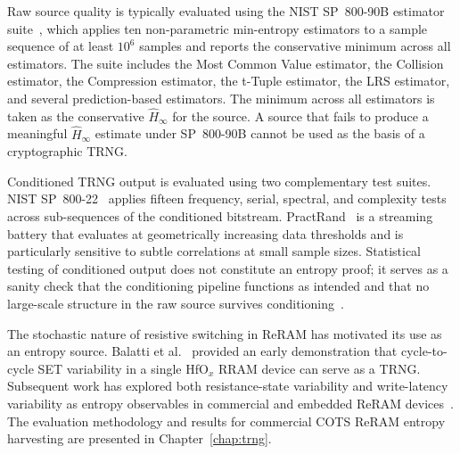 Raw source quality is typically evaluated using the NIST SP~800-90B
estimator suite~\cite{sonmez2016recommendation}, which applies ten
non-parametric min-entropy estimators to a sample sequence of at least
$10^6$ samples and reports the conservative minimum across all
estimators. The suite includes the Most Common Value estimator, the
Collision estimator, the Compression estimator, the t-Tuple estimator,
the LRS estimator, and several prediction-based estimators. The minimum
across all estimators is taken as the conservative $\hat{H}_\infty$ for
the source. A source that fails to produce a meaningful $\hat{H}_\infty$
estimate under SP~800-90B cannot be used as the basis of a cryptographic
TRNG.

Conditioned TRNG output is evaluated using two complementary test
suites. NIST SP~800-22~\cite{rukhin2001statistical} applies fifteen
frequency, serial, spectral, and complexity tests across sub-sequences
of the conditioned bitstream. PractRand~\cite{practrand} is a streaming
battery that evaluates at geometrically increasing data thresholds and
is particularly sensitive to subtle correlations at small sample sizes.
Statistical testing of conditioned output does not constitute an entropy
proof; it serves as a sanity check that the conditioning pipeline
functions as intended and that no large-scale structure in the raw
source survives conditioning~\cite{sonmez2016recommendation}.

The stochastic nature of resistive switching in ReRAM has motivated its
use as an entropy source. Balatti et al.~\cite{balatti2015true} provided
an early demonstration that cycle-to-cycle SET variability in a single
HfO$_x$ RRAM device can serve as a TRNG. Subsequent work has explored
both resistance-state variability and write-latency variability as
entropy observables in commercial and embedded ReRAM
devices~\cite{suri2018high, pang2019memristors, tolga2024trng}. The
evaluation methodology and results for commercial COTS ReRAM entropy
harvesting are presented in Chapter~\ref{chap:trng}.